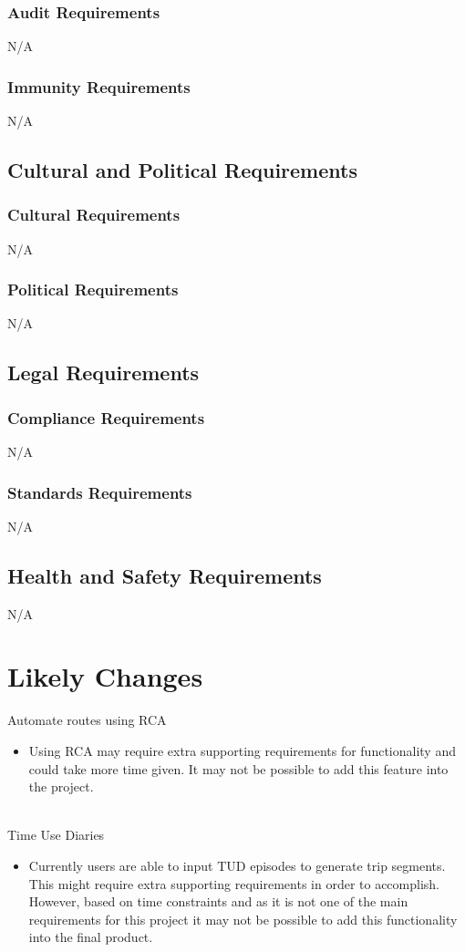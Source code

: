 \documentclass[12pt, titlepage]{article}
\begin{document}
\begin{itemize}
\subsubsection{Audit Requirements}
N/A
\subsubsection{Immunity Requirements}
N/A
\subsection{Cultural and Political Requirements}

\subsubsection{Cultural Requirements}
N/A
\subsubsection{Political Requirements}
N/A
\subsection{Legal Requirements}

\subsubsection{Compliance Requirements}
N/A
\subsubsection{Standards Requirements}
N/A
\subsection{Health and Safety Requirements}
N/A
\end{itemize}
\section{Likely Changes}

Automate routes using RCA
\begin{itemize}
\item Using RCA may require extra supporting requirements for functionality and could take more time given. It may not be possible to add this feature into the project.
\end{itemize}
\\
Time Use Diaries
\begin{itemize}
\item Currently users are able to input TUD episodes to generate trip segments. This might require extra supporting requirements in order to accomplish. However, based on time constraints and as it is not one of the main requirements for this project it may not be possible to add this functionality into the final product.
\end{itemize}
\end{document}

